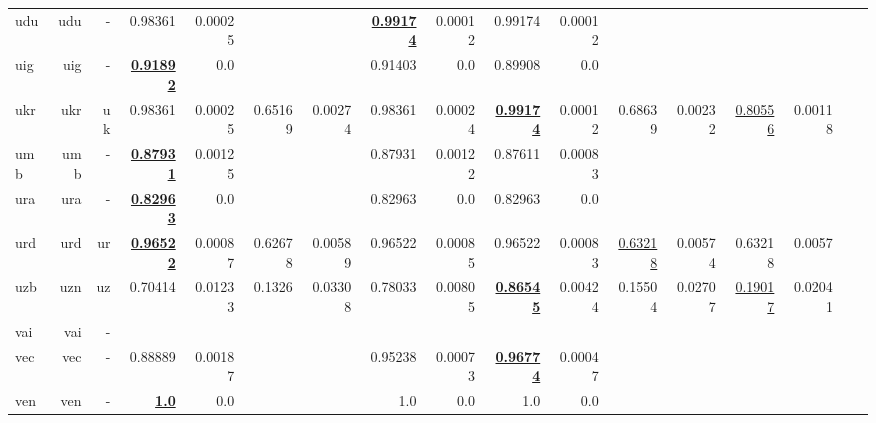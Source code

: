 \documentclass[11pt]{article}
\begin{document}
\begin{table*}[h]
{\begin{tabular}{lrrrrrrrrrrrrrrrr}
udu         & udu         & -         & 0.98361         & 0.00025         &          &          & \textbf{\underline{0.99174}}         & 0.00012         & 0.99174         & 0.00012         &          &          &          &          \\
uig         & uig         & -         & \textbf{\underline{0.91892}}         & 0.0         &          &          & 0.91403         & 0.0         & 0.89908         & 0.0         &          &          &          &          \\
ukr         & ukr         & uk         & 0.98361         & 0.00025         & 0.65169         & 0.00274         & 0.98361         & 0.00024         & \textbf{\underline{0.99174}}         & 0.00012         & 0.68639         & 0.00232         & \underline{0.80556}         & 0.00118         \\
umb         & umb         & -         & \textbf{\underline{0.87931}}         & 0.00125         &          &          & 0.87931         & 0.00122         & 0.87611         & 0.00083         &          &          &          &          \\
ura         & ura         & -         & \textbf{\underline{0.82963}}         & 0.0         &          &          & 0.82963         & 0.0         & 0.82963         & 0.0         &          &          &          &          \\
urd         & urd         & ur         & \textbf{\underline{0.96522}}         & 0.00087         & 0.62678         & 0.00589         & 0.96522         & 0.00085         & 0.96522         & 0.00083         & \underline{0.63218}         & 0.00574         & 0.63218         & 0.0057         \\
uzb         & uzn         & uz         & 0.70414         & 0.01233         & 0.1326         & 0.03308         & 0.78033         & 0.00805         & \textbf{\underline{0.86545}}         & 0.00424         & 0.15504         & 0.02707         & \underline{0.19017}         & 0.02041         \\
vai         & vai         & -         &          &          &          &          &          &          &          &          &          &          &          &          \\
vec         & vec         & -         & 0.88889         & 0.00187         &          &          & 0.95238         & 0.00073         & \textbf{\underline{0.96774}}         & 0.00047         &          &          &          &          \\
ven         & ven         & -         & \textbf{\underline{1.0}}         & 0.0         &          &          & 1.0         & 0.0         & 1.0         & 0.0         &          &          &          &          \\

\end{tabular}}
\end{table*}
\end{document}
